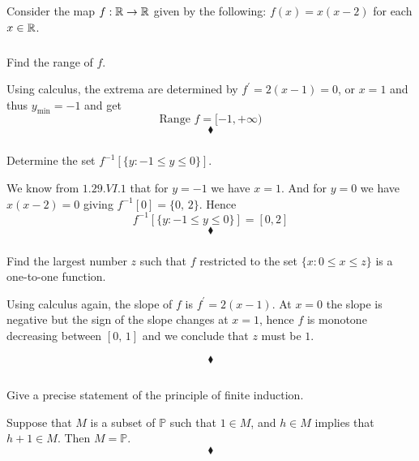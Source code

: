 \subsection{}
Consider the map $f:\mathbb{R}\rightarrow \mathbb{R}$ given by the following: $f(x)=x(x - 2)$ for each $x \in \mathbb{R}$. 
\subsubsection{}
\begin{tcolorbox}
Find the range of $f$.
\end{tcolorbox}
Using calculus, the extrema are determined by $f^{'}= 2(x-1)=0$, or $x=1$ and thus $y_{\text{min}}=-1$ and get 
$$\text{Range } f=[-1,+\infty)$$
$$\blacklozenge$$

\subsubsection{}
\begin{tcolorbox}
Determine the set $f^{-1}\left[\{y:-1\leq y\leq 0\}\right]$. 
\end{tcolorbox}

We know from $1.29.VI.1$ that for $y=-1$ we have $x=1$. And for $y= 0$ we have $x(x-2)=0$ giving $f^{-1}[0]=\{0,\, 2\}$. Hence 
$$f^{-1}\left[\{y:-1\leq y\leq 0\}\right]= [0,2]$$
$$\blacklozenge$$

\subsubsection{}
\begin{tcolorbox} 
Find the largest number $z$ such that $f$ restricted to the set $\{x :0\leq x \leq z\}$ is a one-to-one function. 
\end{tcolorbox}
Using calculus again, the slope of $f$ is $f^{'}= 2(x-1)$. At $x=0$ the slope is negative but the sign of the slope changes at $x=1$, hence $f$ is monotone decreasing between $[0,\,1]$ and we conclude that $z$ must be $1$.

$$\blacklozenge$$
\newpage



\renewcommand{\thesubsection}{\thesection.\RomanNumeralCaps{7}}
\subsection{}
\subsubsection{}
\begin{tcolorbox}
Give a precise statement of the principle of finite induction.  
\end{tcolorbox}
Suppose that $M$ is a subset of $\mathbb{P}$ such that $1 \in M$, and $h \in M$ implies that $h+1\in M$. Then $M = \mathbb{P}$.
$$\blacklozenge$$

